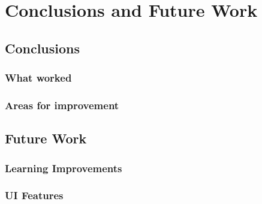 \chapter{Conclusions and Future Work}

\section{Conclusions}

\subsection{What worked}

\subsection{Areas for improvement}

\section{Future Work}

\subsection{Learning Improvements}

\subsection{UI Features}
\pagebreak
%
%